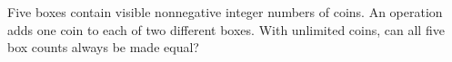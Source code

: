 Five boxes contain visible nonnegative integer numbers of coins. An operation adds one coin to each of two different boxes. With unlimited coins, can all five box counts always be made equal?
